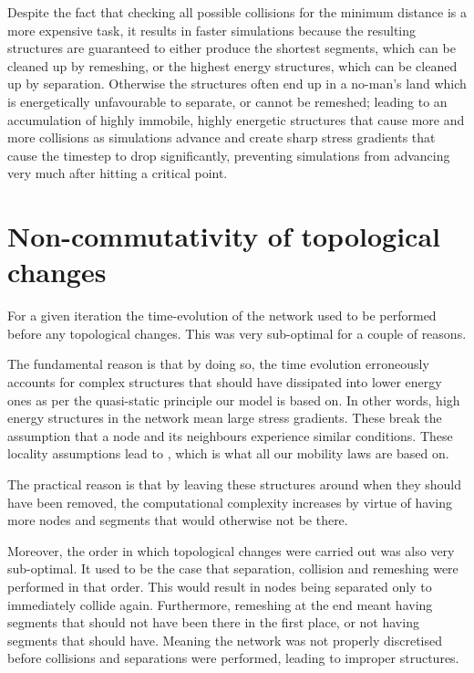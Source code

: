 Despite the fact that checking all possible collisions for the minimum distance is a more expensive task, it results in faster simulations because the resulting structures are guaranteed to either produce the shortest segments, which can be cleaned up by remeshing, or the highest energy structures, which can be cleaned up by separation. Otherwise the structures often end up in a no-man's land which is energetically unfavourable to separate, or cannot be remeshed; leading to an accumulation of highly immobile, highly energetic structures that cause more and more collisions as simulations advance and create sharp stress gradients that cause the timestep to drop significantly, preventing simulations from advancing very much after hitting a critical point.

\section{Non-commutativity of topological changes}\label{s:nonCommutativity}
For a given iteration the time-evolution of the network used to be performed before any topological changes. This was very sub-optimal for a couple of reasons.

The fundamental reason is that by doing so, the time evolution erroneously accounts for complex structures that should have dissipated into lower energy ones as per the quasi-static principle our model is based on. In other words, high energy structures in the network mean large stress gradients. These break the assumption that a node and its neighbours experience similar conditions. These locality assumptions lead to \label{eq:nodeVel}, which is what all our mobility laws are based on.

The practical reason is that by leaving these structures around when they should have been removed, the computational complexity increases by virtue of having more nodes and segments that would otherwise not be there.

Moreover, the order in which topological changes were carried out was also very sub-optimal. It used to be the case that separation, collision and remeshing were performed in that order. This would result in nodes being separated only to immediately collide again. Furthermore, remeshing at the end meant having segments that should not have been there in the first place, or not having segments that should have. Meaning the network was not properly discretised before collisions and separations were performed, leading to improper structures.

